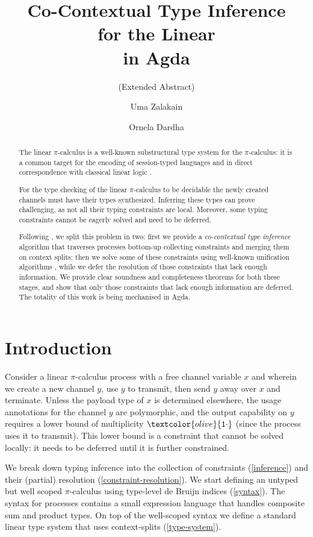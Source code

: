 \documentclass[sigplan,screen,review]{acmart}
\title
[Co-Contextual Type Inference for the Linear \Picalc{} in Agda]
{Co-Contextual Type Inference \\ for the Linear \Picalc{} \\ in Agda}
\subtitle{(Extended Abstract)}
\author{Uma Zalakain}
\affiliation{University of Glasgow}
\author{Ornela Dardha}
\affiliation{University of Glasgow}
\newcommand{\picalc}{$\pi$-calculus}
\newcommand{\constr}[1]{\textcolor{olive}{\mathtt{#1}}}
\newcommand{\tone}{\constr{1\cdot}}
\begin{document}
\begin{abstract}
  The linear \picalc{} is a well-known substructural type system for the \picalc{}:
  it is a common target for the encoding of session-typed languages \cite{DardhaGS17}
  and in direct correspondence with classical linear logic .

  For the type checking of the linear \picalc{} to be decidable the newly created channels must have their types synthesized.
  Inferring these types can prove challenging, as not all their typing constraints are local.
  Moreover, some typing constraints cannot be eagerly solved and need to be deferred.

  Following \cite{Padovani15}, we split this problem in two: first we provide a \emph{co-contextual type inference} \cite{ErdwegBKKM15} algorithm that traverses processes bottom-up collecting constraints and merging them on context splits; then we solve some of these constraints using well-known unification algorithms \cite{McBride03}, while we defer the resolution of those constraints that lack enough information.
  We provide clear soundness and completeness theorems for both these stages, and show that only those constraints that lack enough information are deferred.
  The totality of this work is being mechanised in Agda.
\end{abstract}


\maketitle

\section{Introduction}\label{introduction}

Consider a linear \picalc{} process with a free channel variable $x$ and wherein we create a new channel $y$, use $y$ to transmit, then send $y$ away over $x$ and terminate.
Unless the payload type of $x$ is determined elsewhere, the usage annotations for the channel $y$ are polymorphic, and the output capability on $y$ requires a lower bound of multiplicity $\tone$ (since the process uses it to transmit).
This lower bound is a constraint that cannot be solved locally: it needs to be deferred until it is further constrained.

We break down typing inference into the collection of constraints (\autoref{inference}) and their (partial) resolution (\autoref{constraint-resolution}).
We start defining an untyped but well scoped \picalc{} using type-level de Bruijn \cite{deBruijn72} indices (\autoref{syntax}).
The syntax for processes contains a small expression language that handles composite sum and product types.
On top of the well-scoped syntax we define a standard linear type system that uses context-splits (\autoref{type-system}).
\end{document}
